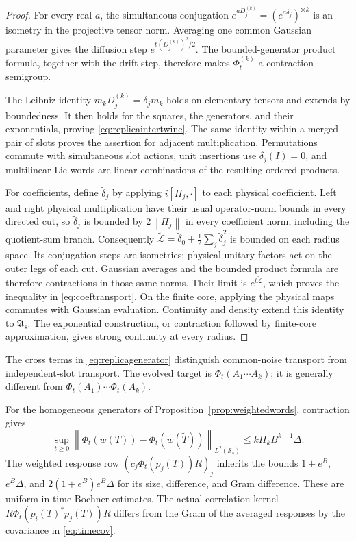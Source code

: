 \documentclass[11pt,a4paper]{amsart}
\numberwithin{equation}{section}
\theoremstyle{definition}
\theoremstyle{remark}
\newcommand{\Sch}{\mathcal S}
\newcommand{\Alg}{\mathfrak A}
\newcommand{\norm}[1]{\left\lVert#1\right\rVert}
\begin{document}
\begin{proof}
For every real $a$, the simultaneous conjugation
$e^{aD_j^{(k)}}=(e^{a\delta_j})^{\otimes k}$
is an isometry in the projective tensor norm. Averaging one common Gaussian parameter gives the diffusion step $e^{t(D_j^{(k)})^2/2}$. The bounded-generator product formula, together with the drift step, therefore makes $\Phi_t^{(k)}$ a contraction semigroup.

The Leibniz identity $m_kD_j^{(k)}=\delta_jm_k$ holds on elementary tensors and extends by boundedness. It then holds for the squares, the generators, and their exponentials, proving \eqref{eq:replicaintertwine}. The same identity within a merged pair of slots proves the assertion for adjacent multiplication. Permutations commute with simultaneous slot actions, unit insertions use $\delta_j(I)=0$, and multilinear Lie words are linear combinations of the resulting ordered products.

For coefficients, define $\widetilde\delta_j$ by applying $i[H_j,\cdot]$ to each physical coefficient. Left and right physical multiplication have their usual operator-norm bounds in every directed cut, so $\widetilde\delta_j$ is bounded by $2\norm{H_j}$ in every coefficient norm, including the quotient-sum branch. Consequently
$\widetilde{\mathcal L}=\widetilde\delta_0+\tfrac12\sum_j\widetilde\delta_j^2$
is bounded on each radius space. Its conjugation steps are isometries: physical unitary factors act on the outer legs of each cut. Gaussian averages and the bounded product formula are therefore contractions in those same norms. Their limit is $e^{t\widetilde{\mathcal L}}$, which proves the inequality in \eqref{eq:coeftransport}. On the finite core, applying the physical maps commutes with Gaussian evaluation. Continuity and density extend this identity to $\Alg_s$. The exponential construction, or contraction followed by finite-core approximation, gives strong continuity at every radius.
\end{proof}
The cross terms in \eqref{eq:replicagenerator} distinguish common-noise transport from independent-slot transport. The evolved target is $\Phi_t(A_1\cdots A_k)$; it is generally different from $\Phi_t(A_1)\cdots\Phi_t(A_k)$.

For the homogeneous generators of Proposition~\ref{prop:weightedwords}, contraction gives
\[
 \sup_{t\ge0}\norm{\Phi_t(w(T))-\Phi_t(w(\widetilde T))}_{L^2(\Sch_s)}
 \le kH_kB^{k-1}\Delta.
\]
The weighted response row $(c_j\Phi_t(p_j(T))R)_j$ inherits the bounds $1+e^B$, $e^B\Delta$, and $2(1+e^B)e^B\Delta$ for its size, difference, and Gram difference. These are uniform-in-time Bochner estimates. The actual correlation kernel $R\Phi_t(p_i(T)^*p_j(T))R$ differs from the Gram of the averaged responses by the covariance in \eqref{eq:timecov}.
\end{document}
